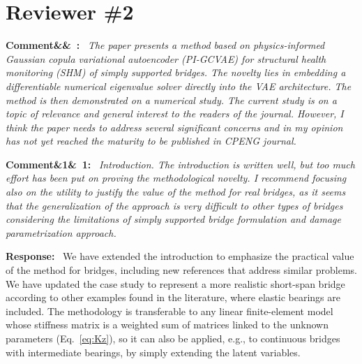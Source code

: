 \documentclass[11pt]{article}
\newenvironment{rcomment}[1]{\par\bigskip\noindent\textbf{Comment\ifx&#1&\else\ #1\fi:}\ \itshape}{\par}
\newenvironment{response}{\par\smallskip\noindent\color{resp}\textbf{Response:}\ }{\par}
\newenvironment{action}{\par\smallskip\noindent\color{resp}\textbf{Action:}\ }{\par}
\newcommand{\authornote}[1]{\textcolor{note}{\textsf{[Authors: #1]}}}
\newcommand{\tbd}[1]{\textcolor{note}{\textsf{[#1]}}}
\newcommand{\lines}[1]{\tbd{lines #1}}
\begin{document}
\section{Reviewer \#2}

\begin{rcomment}{}
The paper presents a method based on physics-informed Gaussian copula variational autoencoder (PI-GCVAE) for
structural health monitoring (SHM) of simply supported bridges. The novelty lies in embedding a differentiable numerical
eigenvalue solver directly into the VAE architecture. The method is then demonstrated on a numerical study. The current
study is on a topic of relevance and general interest to the readers of the journal. However, I think the paper needs to
address several significant concerns and in my opinion has not yet reached the maturity to be published in CPENG
journal.
\end{rcomment}

\begin{rcomment}{1}
Introduction. The introduction is written well, but too much effort has been put on proving the methodological novelty. I recommend focusing also on the utility to justify the value of the method for real bridges, as it seems that the generalization of the approach is very difficult to other types of bridges considering the limitations of simply
supported bridge formulation and damage parametrization approach.
\end{rcomment}

\begin{response}
We have extended the introduction to emphasize the practical value of the method for bridges, including new references that address similar problems. 
We have updated the case study to represent a more realistic short-span bridge according to other examples found in the literature, where elastic bearings are included. 
The methodology is transferable to any linear finite-element model whose stiffness matrix is a weighted sum of matrices linked to the unknown parameters (Eq.~\eqref{eq:Kz}), so it can also be applied, e.g., to continuous bridges with intermediate bearings, by simply extending the latent variables.

\end{response}
%
\end{document}
